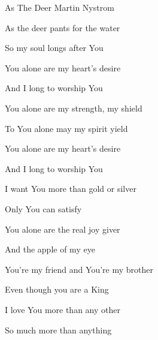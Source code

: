 \documentclass[12pt]{book}
\begin{document}
\begin{song}{As The Deer}{}
  {}
  {Martin Nystrom}
  {}
  {}

  \begin{SBVerse}
    As the deer pants for the water

    So my soul longs after You

    You alone are my heart's desire

    And I long to worship You
  \end{SBVerse}

  \begin{SBOpGroup}
    You alone are my strength, my shield

    To You alone may my spirit yield

    You alone are my heart's desire

    And I long to worship You
  \end{SBOpGroup}

  \begin{SBVerse}
    I want You more than gold or silver

    Only You can satisfy

    You alone are the real joy giver

    And the apple of my eye
  \end{SBVerse}

  \begin{SBVerse}
    You're my friend and You're my brother

    Even though you are a King

    I love You more than any other

    So much more than anything
  \end{SBVerse}
\end{song}
\end{document}
